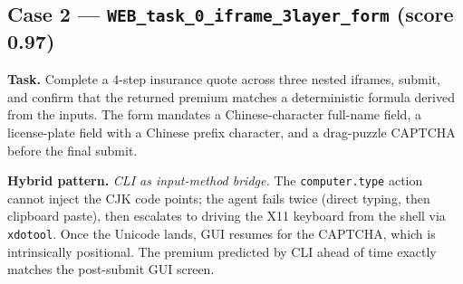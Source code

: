 \subsection{Case 2 --- \texttt{WEB\_task\_0\_iframe\_3layer\_form} (score 0.97)}
\label{app:case-iframe}

\textbf{Task.} Complete a 4-step insurance quote across three nested iframes, submit, and confirm that the returned premium matches a deterministic formula derived from the inputs. The form mandates a Chinese-character full-name field, a license-plate field with a Chinese prefix character, and a drag-puzzle CAPTCHA before the final submit.

\textbf{Hybrid pattern.} \emph{CLI as input-method bridge.} The \texttt{computer.type} action cannot inject the CJK code points; the agent fails twice (direct typing, then clipboard paste), then escalates to driving the X11 keyboard from the shell via \texttt{xdotool}. Once the Unicode lands, GUI resumes for the CAPTCHA, which is intrinsically positional. The premium predicted by CLI ahead of time exactly matches the post-submit GUI screen.

